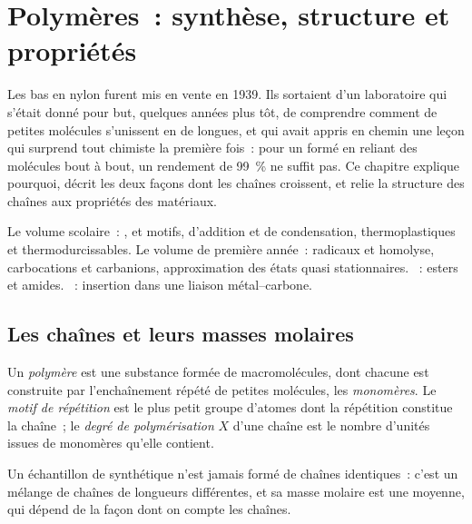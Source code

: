 \chapter{Polymères~: synthèse, structure et propriétés}\label{ch:b2:polymer-synthesis}

Les bas en nylon furent mis en vente en 1939. Ils sortaient d'un laboratoire qui s'était donné pour but,
quelques années plus tôt, de comprendre comment de petites molécules s'unissent en de longues, et qui
avait appris en chemin une leçon qui surprend tout chimiste la première fois~: pour un  formé en
reliant des molécules bout à bout, un rendement de 99~\% ne suffit pas. Ce chapitre explique pourquoi,
décrit les deux façons dont les chaînes croissent, et relie la structure des chaînes aux propriétés des
matériaux.

\begin{recall}
Le volume scolaire~: ,  et motifs,  d'addition et de condensation,
thermoplastiques et thermodurcissables. Le volume de première année~: radicaux et homolyse,
carbocations et carbanions, approximation des états quasi stationnaires. ~:
esters et amides. ~: insertion dans une liaison métal--carbone.
\end{recall}

\section{Les chaînes et leurs masses molaires}

\begin{definition}[Polymère]\label{def:b2:polymer-synthesis:polymer}
Un \emph{polymère} est une substance formée de macromolécules, dont chacune est
construite par l'enchaînement répété de petites molécules, les \emph{monomères}.
Le \emph{motif de répétition}
est le plus petit groupe d'atomes dont la répétition constitue la chaîne~; le \emph{degré de
polymérisation} $X$ d'une chaîne est le nombre
d'unités issues de monomères qu'elle contient.
\end{definition}

Un échantillon de  synthétique n'est jamais formé de chaînes identiques~: c'est un mélange de
chaînes de longueurs différentes, et sa masse molaire est une moyenne, qui dépend de la façon dont on
compte les chaînes.


